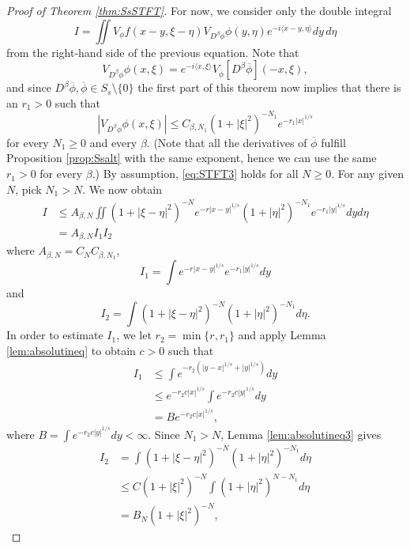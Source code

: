 \documentclass[11pt,a4paper,reqno]{amsart}
\numberwithin{equation}{section}
\theoremstyle{definition}
\theoremstyle{definition}
\begin{document}
\begin{proof}[Proof of Theorem \ref{thm:SsSTFT}]
For now, we consider only the double integral 
\begin{equation*}
    I = \iint V_\phi f(x-y,\xi-\eta) V_{D^\beta\phi}\phi(y,\eta) e^{-i\langle x-y,\eta \rangle} d y \, d \eta
\end{equation*}
from the right-hand side of the previous equation. Note that
\begin{equation*}
    V_{D^\beta \phi}\phi(x,\xi) = e^{-i\langle x,\xi\rangle} V_{\overline{\phi}} [D^\beta\overline{\phi}](-x,\xi),
\end{equation*}
and since $D^\beta\overline{\phi},\overline{\phi}\in S_s\setminus\{0\}$ the first part of this theorem now implies that there is an $r_1 > 0$ such that
\begin{equation*}
    |V_{D^\beta \phi}\phi(x,\xi)| \leq C_{\beta,N_1} (1+|\xi|^2)^{-N_1} e^{-r_1 |x|^{1/s}}
\end{equation*}
for every $N_1\geq 0$ and every $\beta$. (Note that all the derivatives of $\overline{\phi}$ fulfill Proposition \ref{prop:Ssalt} with the same exponent, hence we can use the same $r_1>0$ for every $\beta$.) By assumption, \eqref{eq:STFT3} holds for all $N\geq 0$. For any given $N$, pick $N_1 > N$. We now obtain
\begin{align*}
    I &\leq A_{\beta,N} \iint (1+|\xi-\eta|^2)^{-N} e^{- r |x-y|^{1/s}}(1+|\eta|^2)^{-N_1} e^{-r_1 |y|^{1/s}} d y d \eta \\
    &= A_{\beta,N} I_1 I_2
\end{align*}
where $A_{\beta,N} = C_N C_{\beta,N_1}$, $$I_1 = \int e^{- r |x-y|^{1/s}} e^{-r_1 |y|^{1/s}} d y$$ and $$I_2 = \int (1+|\xi-\eta|^2)^{-N}(1+|\eta|^2)^{-N_1} d \eta.$$  
In order to estimate $I_1$, we let $r_2 = \min\{r,r_1\}$ and apply Lemma \ref{lem:absolutineq} to obtain $c>0$ such that
\begin{align*}
    I_1 &\leq \int e^{-r_2( |y-x|^{1/s} + |y|^{1/s})} d y \\
    &\leq e^{- r_2 c |x|^{1/s}} \int e^{- r_2 c |y|^{1/s}} d y \\
    &= B e^{- r_2 c |x|^{1/s}},
\end{align*}
where $B = \int e^{- r_2 c |y|^{1/s}} d y < \infty$. Since $N_1 > N$, Lemma \ref{lem:absolutineq3} gives
\begin{align*}
    I_2 &= \int (1+|\xi-\eta|^2)^{-N}(1+|\eta|^2)^{-N_1} d \eta \\
    &\leq C (1+|\xi|^2)^{-N}\int (1+|\eta|^2)^{N - N_1} d \eta \\
    &= B_N (1 + |\xi|^2)^{- N},
\end{align*}

\end{proof}
\end{document}
